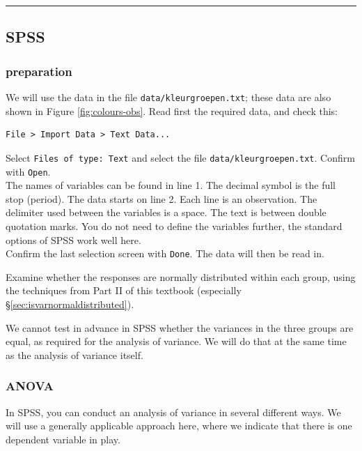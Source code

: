 \documentclass[
]{book}
\begin{document}
\begin{center}\rule{0.5\linewidth}{0.5pt}\end{center}

\hypertarget{spss-12}{%
\subsection{SPSS}\label{spss-12}}

\hypertarget{preparation-1}{%
\subsubsection{preparation}\label{preparation-1}}

We will use the data in the file \texttt{data/kleurgroepen.txt}; these data are also shown in Figure \ref{fig:colours-obs}.
Read first the required data, and check this:

\begin{verbatim}
File > Import Data > Text Data...
\end{verbatim}

Select \texttt{Files\ of\ type:\ Text} and select the file
\texttt{data/kleurgroepen.txt}. Confirm with \texttt{Open}.\\
The names of variables can be found in line 1. The decimal symbol is
the full stop (period). The data starts on line 2. Each line is an observation.
The delimiter used between the variables is a space. The text is between
double quotation marks. You do not need to define the variables further,
the standard options of SPSS work well here.\\
Confirm the last selection screen with \texttt{Done}. The data will
then be read in.

Examine whether the responses are normally distributed within each group, using the
techniques from Part II of this textbook (especially
§\ref{sec:isvarnormaldistributed}).

We cannot test in advance in SPSS whether the variances in the three groups
are equal, as required for the analysis of variance. We will do that at the same
time as the analysis of variance itself.

\hypertarget{anova}{%
\subsubsection{ANOVA}\label{anova}}

In SPSS, you can conduct an analysis of variance in several
different ways. We
will use a generally applicable approach here, where we indicate that there
is one dependent variable in play.\\
\end{document}
